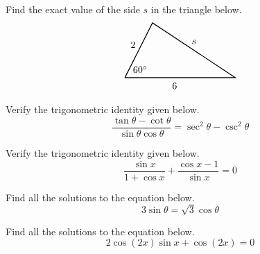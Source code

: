 \documentclass[12pt,letterpaper]{exam}
\begin{document}
\begin{questions}
\newpage
\question[10] Find the exact value of the side $s$ in the triangle below.
	\[
	\begin{tikzpicture}
	\draw[line width=0.03cm] (0,0) -- (1,2) -- (4,0) -- (0,0);
	\node at (0.55,0.3) {$60^\circ$};
	\node at (0.3,1.2) {$2$};
	\node at (1.8,-0.3) {$6$};
	\node at (2.5,1.3) {$s$};
	\end{tikzpicture}
	\]



\newpage
\question[10] Verify the trigonometric identity given below.
	\[
	\dfrac{\tan \theta - \cot \theta}{\sin \theta \cos \theta}= \sec^2 \theta - \csc^2 \theta
	\]



\newpage
\question[10] Verify the trigonometric identity given below.
	\[
	\dfrac{\sin x}{1 + \cos x} + \dfrac{\cos x - 1}{\sin x}= 0 
	\]



\newpage
\question[10] Find all the solutions to the equation below.
	\[
	3\sin \theta= \sqrt{3} \cos \theta
	\]



\newpage
\question[10] Find all the solutions to the equation below.
	\[
	2 \cos(2x) \sin x + \cos(2x)= 0 
	\]





























\end{questions}
\end{document}
